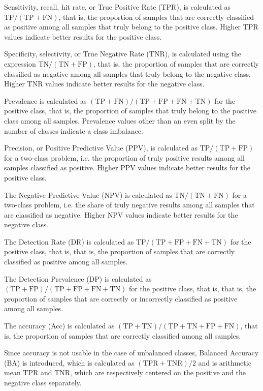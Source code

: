 \documentclass[sn-mathphys-num]{sn-jnl}%
\begin{document}
Sensitivity, recall, hit rate, or True Positive Rate (TPR), is calculated as $\mathrm{TP}/(\mathrm{TP}+\mathrm{FN})$, that is, the proportion of samples that are correctly classified as positive among all samples that truly belong to the positive class. Higher TPR values indicate better results for the positive class.

Specificity, selectivity, or True Negative Rate (TNR), is calculated using the expression $\mathrm{TN}/(\mathrm{TN}+\mathrm{FP})$, that is, the proportion of samples that are correctly classified as negative among all samples that truly belong to the negative class. Higher TNR values indicate better results for the negative class.

Prevalence is calculated as $(\mathrm{TP}+\mathrm{FN})/(\mathrm{TP}+\mathrm{FP}+\mathrm{FN}+\mathrm{TN})$ for the positive class, that is, the proportion of samples that truly belong to the positive class among all samples. Prevalence values other than an even split by the number of classes indicate a class imbalance.

Precision, or Positive Predictive Value (PPV), is calculated as $\mathrm{TP}/(\mathrm{TP}+\mathrm{FP})$ for a two-class problem, i.e. the proportion of truly positive results among all samples classified as positive. Higher PPV values indicate better results for the positive class.

The Negative Predictive Value (NPV) is calculated as $\mathrm{TN}/(\mathrm{TN}+\mathrm{FN})$ for a two-class problem, i.e. the share of truly negative results among all samples that are classified as negative. Higher NPV values indicate better results for the negative class.

The Detection Rate (DR) is calculated as $\mathrm{TP}/(\mathrm{TP}+\mathrm{FP}+\mathrm{FN}+\mathrm{TN})$ for the positive class, that is, that is, the proportion of samples that are correctly classified as positive among all samples.

The Detection Prevalence (DP) is calculated as $(\mathrm{TP}+\mathrm{FP})/(\mathrm{TP}+\mathrm{FP}+\mathrm{FN}+\mathrm{TN})$ for the positive class, that is, that is, the proportion of samples that are correctly or incorrectly classified as positive among all samples.

The accuracy (Acc) is calculated as $(\mathrm{TP} + \mathrm{TN}) / (\mathrm{TP} + \mathrm{TN} + \mathrm{FP} + \mathrm{FN})$, that is, the proportion of samples that are correctly classified among all samples.

Since accuracy is not usable in the case of unbalanced classes, Balanced Accuracy (BA) is introduced, which is calculated as $(\mathrm{TPR} + \mathrm{TNR}) / 2$ and is arithmetic mean TPR and TNR, which are respectively centered on the positive and the negative class separately.
\end{document}

